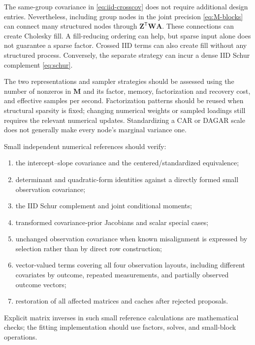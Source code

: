 \documentclass[11pt]{article}
\newcommand{\bA}{\bm{A}}
\newcommand{\bM}{\bm{M}}
\newcommand{\bW}{\bm{W}}
\newcommand{\bZ}{\bm{Z}}
\newcommand{\trans}{^{\mathsf T}}
\begin{document}
The same-group covariance in \eqref{eq:iid-crosscov} does not require additional
design entries. Nevertheless, including group nodes in the joint precision
\eqref{eq:M-blocks} can connect many structured nodes through $\bZ\trans\bW\bA$.
These connections can create Cholesky fill. A fill-reducing ordering can help,
but sparse input alone does not guarantee a sparse factor. Crossed IID terms can
also create fill without any structured process. Conversely, the separate
strategy can incur a dense IID Schur complement \eqref{eq:schur}.

The two representations and sampler strategies should be assessed using the
number of nonzeros in $\bM$ and its factor, memory, factorization and recovery
cost, and effective samples per second. Factorization patterns should be reused
when structural sparsity is fixed; changing numerical weights or sampled
loadings still requires the relevant numerical updates. Standardizing a CAR or
DAGAR scale does not generally make every node's marginal variance one.

Small independent numerical references should verify:
\begin{enumerate}
\item the intercept--slope covariance and the centered/standardized equivalence;
\item determinant and quadratic-form identities against a directly formed small
observation covariance;
\item the IID Schur complement and joint conditional moments;
\item transformed covariance-prior Jacobians and scalar special cases;
\item unchanged observation covariance when known misalignment is expressed by
selection rather than by direct row construction;
\item vector-valued terms covering all four observation layouts, including
different covariates by outcome, repeated measurements, and partially observed
outcome vectors;
\item restoration of all affected matrices and caches after rejected proposals.
\end{enumerate}
Explicit matrix inverses in such small reference calculations are mathematical
checks; the fitting implementation should use factors, solves, and small-block
operations.
\end{document}
